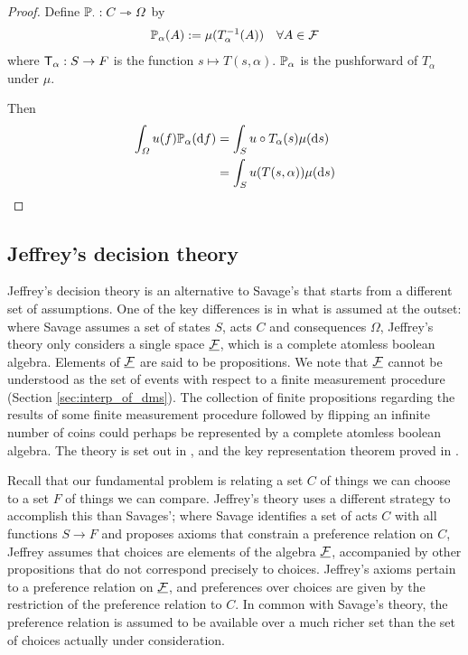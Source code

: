 \begin{proof}
Define $\mathbb{P}_\cdot:C\rightarrowtriangle \Omega$ by
\begin{align}
    \mathbb{P}_\alpha(A) &:= \mu (T_\alpha^{-1}(A))&\forall A\in \mathcal{F}
\end{align}
where $\mathsf{T}_\alpha:S\to F$ is the function $s\mapsto T(s,\alpha)$. $\mathbb{P}_\alpha$ is the pushforward of $T_\alpha$ under $\mu$.

Then 
\begin{align}
    \int_\Omega u(f)\mathbb{P}_\alpha(\mathrm{d}f) &= \int_S u \circ T_\alpha (s)\mu(\mathrm{d}s)\\
    &= \int_S u(T(s,\alpha))\mu(\mathrm{d}s)
\end{align}
\end{proof}

\subsection{Jeffrey's decision theory}

Jeffrey's decision theory is an alternative to Savage's that starts from a different set of assumptions. One of the key differences is in what is assumed at the outset: where Savage assumes a set of states $S$, acts $C$ and consequences $\Omega$, Jeffrey's theory only considers a single space $\underline{\mathcal{F}}$, which is a complete atomless boolean algebra. Elements of $\underline{\mathcal{F}}$ are said to be propositions. We note that $\underline{\mathcal{F}}$ cannot be understood as the set of events with respect to a finite measurement procedure (Section \ref{sec:interp_of_dms}). The collection of finite propositions regarding the results of some finite measurement procedure followed by flipping an infinite number of coins could perhaps be represented by a complete atomless boolean algebra. The theory is set out in \citet{jeffrey_logic_1990}, and the key representation theorem proved in \citet{bolker_functions_1966}.

Recall that our fundamental problem is relating a set $C$ of things we can choose to a set $F$ of things we can compare. Jeffrey's theory uses a different strategy to accomplish this than Savages'; where Savage identifies a set of acts $C$ with all functions $S\to F$ and proposes axioms that constrain a preference relation on $C$, Jeffrey assumes that choices are elements of the algebra $\underline{\mathcal{F}}$, accompanied by other propositions that do not correspond precisely to choices. Jeffrey's axioms pertain to a preference relation on $\underline{\mathcal{F}}$, and preferences over choices are given by the restriction of the preference relation to $C$. In common with Savage's theory, the preference relation is assumed to be available over a much richer set than the set of choices actually under consideration.

